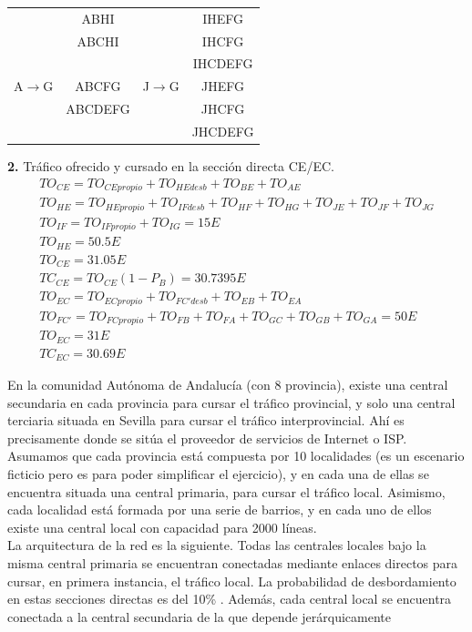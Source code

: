 \begin{exercise}[10]
\begin{center}
\begin{tabular}{c c c c}
 		& ABHI		&			& IHEFG		\\
 		& ABCHI		&			& IHCFG		\\
 		& 			&			& IHCDEFG	\\
A$\to$G & ABCFG  	& J$\to$G 	& JHEFG 	\\
 		& ABCDEFG	&			& JHCFG		\\
 		& 			&			& JHCDEFG	\\
\end{tabular}
\end{center}
\textbf{2.} Tráfico ofrecido y cursado en la sección directa CE/EC.\\
\begin{gather*}
TO_{CE}=TO_{CEpropio}+TO_{HEdesb}+TO_{BE}+TO_{AE}\\
TO_{HE}=TO_{HEpropio}+TO_{IFdesb}+TO_{HF}+TO_{HG}+TO_{JE}+TO_{JF}+TO_{JG}\\
TO_{IF}=TO_{IFpropio}+TO_{IG}=15E\\
TO_{HE}=50.5E\\
TO_{CE}=31.05E\\
TC_{CE}=TO_{CE}(1-P_B)=30.7395E\\
TO_{EC}=TO_{ECpropio}+TO_{FC'desb}+TO_{EB}+TO_{EA}\\
TO_{FC'}=TO_{FCpropio}+TO_{FB}+TO_{FA}+TO_{GC}+TO_{GB}+TO_{GA}=50E\\
TO_{EC}=31E\\
TC_{EC}=30.69E
\end{gather*}
\end{exercise}
\begin{exercise}[11]
En la comunidad Autónoma de Andalucía (con 8 provincia), existe una central secundaria en cada provincia para cursar el tráfico provincial, y solo una central terciaria situada en Sevilla para cursar el tráfico interprovincial. Ahí es precisamente donde se sitúa el proveedor de servicios de Internet o ISP. Asumamos que cada provincia está compuesta por 10 localidades (es un escenario ficticio pero es para poder simplificar el ejercicio), y en cada una de ellas se encuentra situada una central primaria, para cursar el tráfico local. Asimismo, cada localidad está formada por una serie de barrios, y en cada uno de ellos existe una central local con capacidad para 2000 líneas.\\
La arquitectura de la red es la siguiente. Todas las centrales locales bajo la misma central primaria se encuentran conectadas mediante enlaces directos para cursar, en primera instancia, el tráfico local. La probabilidad de desbordamiento en estas secciones directas es del 10\% . Además, cada central local se encuentra conectada a la central secundaria de la que depende jerárquicamente
\end{exercise}